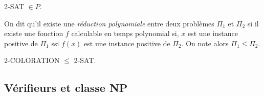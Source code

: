 \begin{theorem}[SAT]
    2-SAT $ \in P$.
\end{theorem}

\begin{definition}
    On dit qu'il existe une \emph{réduction polynomiale} entre deux problèmes $ \Pi_1$ et $ \Pi_2$ si il 
    existe une fonction $f$ calculable en temps polynomial si, $x$ est une instance positive de $ \Pi_1$ 
    ssi $f(x)$ est une instance positive de $ \Pi_2$. On note alors $ \Pi_1 \leqslant \Pi_2$.
\end{definition}

\begin{theorem}[Réduction]
    2-COLORATION $ \leqslant$ 2-SAT.
\end{theorem}


\subsection{Vérifieurs et classe NP}




